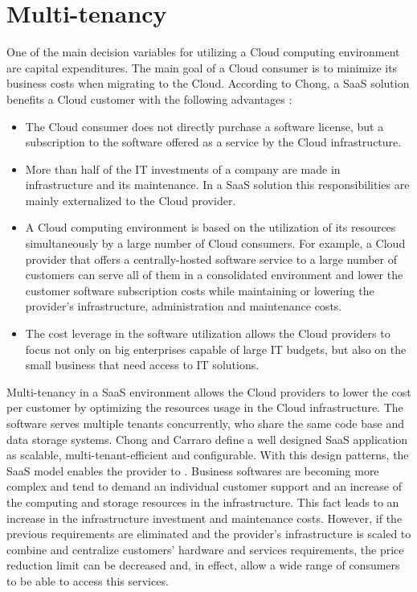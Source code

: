 \section{Multi-tenancy}
\label{sec:multitenancy}   

One of the main decision variables for utilizing a Cloud computing environment are capital expenditures. The main goal of a Cloud consumer is to minimize its business costs when migrating to the Cloud. According to Chong, a \ac{SaaS} solution benefits a Cloud customer with the following advantages \cite{ChongB2006}:

	\begin{itemize}
		\item The Cloud consumer does not directly purchase a software license, but a subscription to the software offered as a service by the Cloud infrastructure. 
		\item More than half of the IT investments of a company are made in infrastructure and its maintenance. In a \ac{SaaS} solution this responsibilities are mainly externalized to the Cloud provider.   
		\item A Cloud computing environment is based on the utilization of its resources simultaneously by a large number of Cloud consumers. For example, a Cloud provider that offers a centrally-hosted software service to a large number of customers can serve all of them in a consolidated environment and lower the customer software subscription costs while maintaining or lowering the provider's infrastructure, administration and maintenance costs. 
		\item The cost leverage in the software utilization allows the Cloud providers to focus not only on big enterprises capable of large IT budgets, but also on the small business that need access to IT solutions. 
	\end{itemize} 

Multi-tenancy in a \ac{SaaS} environment allows the Cloud providers to lower the cost per customer by optimizing the resources usage in the Cloud infrastructure. The software serves multiple tenants concurrently, who share the same code base and data storage systems. Chong and Carraro \cite{ChongB2006} define a well designed \ac{SaaS} application as scalable, multi-tenant-efficient and configurable. With this design patterns, the \ac{SaaS} model enables the provider to . Business softwares are becoming more complex and tend to demand an individual customer support and an increase of the computing and storage resources in the infrastructure. This fact leads to an increase in the infrastructure investment and maintenance costs. However, if the previous requirements are eliminated and the provider's infrastructure is scaled to combine and centralize customers' hardware and services requirements, the price reduction limit can be decreased and, in effect, allow a wide range of consumers to be able to access this services.

